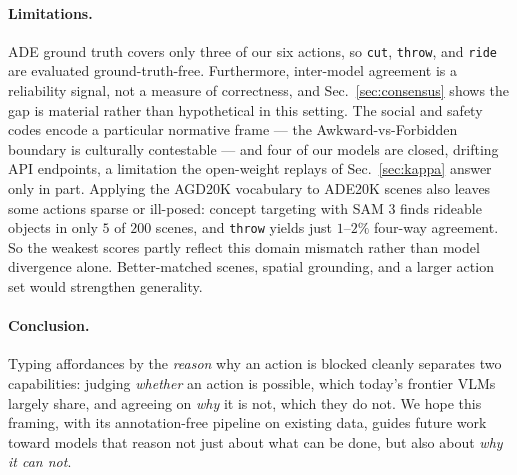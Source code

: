 \documentclass[runningheads]{llncs}
\begin{document}
\paragraph{Limitations.}
ADE ground truth covers only three of our six actions, so \texttt{cut}, \texttt{throw}, and \texttt{ride} are evaluated ground-truth-free.
Furthermore, inter-model agreement is a reliability signal, not a measure of correctness, and Sec.~\ref{sec:consensus} shows the gap is material rather than hypothetical in this setting.
The social and safety codes encode a particular normative frame --- the Awkward-vs-Forbidden boundary is culturally contestable --- and four of our models are closed, drifting API endpoints, a limitation the open-weight replays of Sec.~\ref{sec:kappa} answer only in part.
Applying the AGD20K vocabulary to ADE20K scenes also leaves some actions sparse or ill-posed: concept targeting with SAM 3 finds rideable objects in only $5$ of $200$ scenes, and \texttt{throw} yields just $1$--$2\%$ four-way agreement. 
So the weakest scores partly reflect this domain mismatch rather than model divergence alone. 
Better-matched scenes, spatial grounding, and a larger action set would strengthen generality.

\paragraph{Conclusion.}
Typing affordances by the \emph{reason} why an action is blocked cleanly separates two capabilities: judging \emph{whether} an action is possible, which today's frontier VLMs largely share, and agreeing on \emph{why} it is not, which they do not.
We hope this framing, with its annotation-free pipeline on existing data, guides future work toward models that reason not just about what can be done, but also about \emph{why it can not}.

%
%


\end{document}
